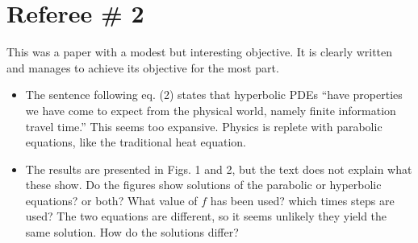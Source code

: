 \documentclass[10pt,letterpaper]{article}
\begin{document}
	\section{Referee \# 2}
	
	This was a paper with a modest but interesting objective.  It is clearly written and manages to achieve its objective for the most part.
	
	\begin{itemize}
		\item The sentence following eq. (2) states that hyperbolic PDEs ``have properties we have come to expect from the physical world, namely finite information travel time.''  This seems too expansive.  Physics is replete with parabolic equations, like the traditional heat equation.
		\item The results are presented in Figs. 1 and 2, but the text does not explain what these show. Do the figures show solutions of the parabolic or hyperbolic equations?  or both?  What value of $f$ has been used?  which times steps are used?  The two equations are different, so it seems unlikely they yield the same solution.  How do the solutions differ?
	\end{itemize}
	
\end{document}
